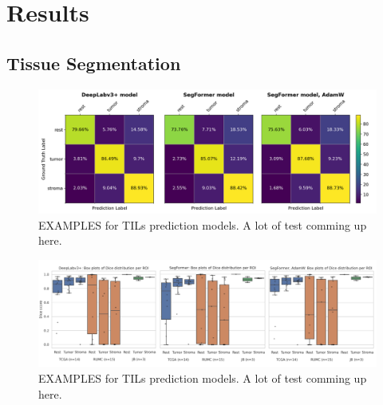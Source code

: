 \chapter{Results}
\section{Tissue Segmentation}
\begin{figure}
\includegraphics[width=\linewidth]{figures/tissue/conf_matrices.png}
\caption{EXAMPLES for TILs prediction models. A lot of test comming up here.}
\label{fig:figure3}
\end{figure}

\begin{figure}
\includegraphics[width=\linewidth]{figures/tissue/dices.png}
\caption{EXAMPLES for TILs prediction models. A lot of test comming up here.}
\label{fig:figure3}
\end{figure}


